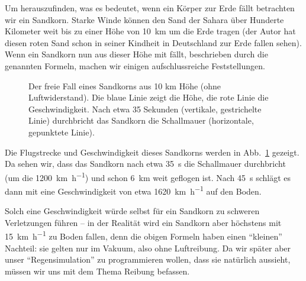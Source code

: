 Um herauszufinden, was es bedeutet, wenn ein Körper zur Erde fällt betrachten wir ein Sandkorn. Starke Winde können den Sand der Sahara über Hunderte Kilometer weit  bis zu einer Höhe von \qty{10}{\km} um die Erde tragen (der Autor hat diesen roten Sand schon in seiner Kindheit in Deutschland zur Erde fallen sehen). 
Wenn ein Sandkorn nun aus dieser Höhe mit fällt, beschrieben durch die genannten Formeln, machen wir einigen aufschlussreiche Feststellungen.
\begin{figure}[h]
    
    \caption{Der freie Fall eines Sandkorns aus 10 km Höhe (ohne Luftwiderstand). Die blaue Linie zeigt die Höhe, die rote Linie die Geschwindigkeit. Nach etwa 35 Sekunden (vertikale, gestrichelte Linie) durchbricht das Sandkorn die Schallmauer (horizontale, gepunktete Linie).}
    \label{fig:physik:bewegung:sandkorn}
\end{figure}
Die Flugstrecke und Geschwindigkeit dieses Sandkorns werden in Abb.~\ref{fig:physik:bewegung:sandkorn} gezeigt. Da sehen wir, dass das Sandkorn nach etwa \qty{35}{s} die Schallmauer durchbricht (um die \qty{1200}{\km\per\hour}) und schon \qty{6}{\km} weit geflogen ist. Nach \qty{45}{\second} schlägt es dann mit eine Geschwindigkeit von etwa \qty{1620}{\km\per\hour} auf den Boden. 

Solch eine Geschwindigkeit würde selbst für ein Sandkorn zu schweren Verletzungen führen -- in der Realität wird ein Sandkorn aber höchstens mit \qty{15}{\km\per\hour} zu Boden fallen, denn die obigen Formeln haben einen ``kleinen'' Nachteil: sie gelten nur im Vakuum, also ohne Luftreibung. Da wir später aber unser ``Regensimulation'' zu programmieren wollen, dass sie natürlich aussieht, müssen wir uns mit dem Thema Reibung befassen.
